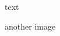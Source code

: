 \documentclass{beamer}
\begin{document}
\begin{frame}
text
\end{frame}


\begin{frame}
another image
\end{frame}
\end{document}
